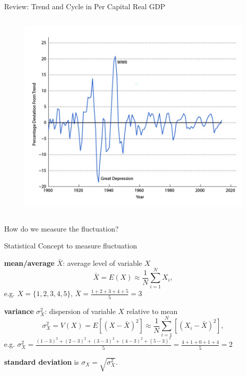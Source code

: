 \documentclass[11pt,aspectratio=169,usenames,dvipsnames]{beamer}
\let\tempone\itemize
\let\temptwo\enditemize
\renewenvironment{itemize}{\tempone\addtolength{\itemsep}{\fill}}{\temptwo}
\begin{document}
\begin{frame}{Review: Trend and Cycle in Per Capital Real GDP}
\begin{columns}
\begin{column}{0.5\textwidth}
\begin{figure}
            \includegraphics[width=\textwidth]{./figures/Figure1_4.jpg}
        \end{figure}
    \end{column}
\end{columns}
\begin{center}
    How do we measure the fluctuation?
\end{center}
\end{frame}

\begin{frame}{Statistical Concept to measure fluctuation}
\label{slide:Statistical_Concept}
    \begin{itemize}
        \item \textbf{mean/average} $ \bar{X} $: average level of variable $ X $
        \begin{equation}
        \label{eq:average}
            \bar{X} = E( X ) \approx \frac{1}{N} \sum_{i=1}^{N} X_{i}
        ,\end{equation}
        e.g. $ X = \{ 1, 2, 3, 4, 5 \} $, $ \bar{X} = \frac{1+2+3+4+5}{5} = 3 $
        \item \textbf{variance} $ \sigma_{X}^{2} $: dispersion of variable $ X $ relative to mean
        \begin{equation}
        \label{eq:variance}
            \sigma_{X}^{2} = V( X ) = E[ ( X - \bar{X} )^{2} ] \approx \frac{1}{N} \sum_{i=1}^{N} [ ( X_{i} - \bar{X} )^{2} ]
        ,\end{equation}
        e.g. $ \sigma_{X}^{2} = \frac{( 1-3 )^{2} + ( 2-3 )^{2} + ( 3-3 )^{2} + ( 4-3 )^{2} + ( 5-3 )^{2}}{5} = \frac{4 + 1 + 0 + 1 + 4}{5} = 2  $

        \textbf{standard deviation} is $ \sigma_{X} = \sqrt{\sigma_{X}^{2}} $.

    \end{itemize}
\end{frame}
\end{document}
